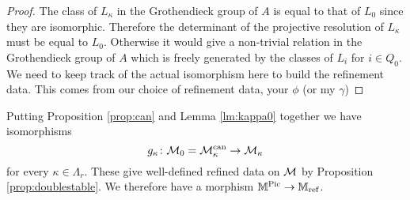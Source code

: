\documentclass[12pt]{amsart}
\begin{document}
\begin{proof}
The class of $L_\kappa$ in the Grothendieck group of $A$ is equal to that of $L_0$ since they are isomorphic.
Therefore the determinant of the projective resolution of $L_\kappa$ must be equal to $L_0$. Otherwise it would give a non-trivial relation in the Grothendieck group of $A$ which is freely generated by the classes of $L_i$ for $i\in Q_0$. {\red We need to keep track of the actual isomorphism here to build the refinement data. This comes from our choice of refinement data, your $\phi$ (or  my $\gamma$)}
\end{proof}

Putting Proposition \ref{prop:can} and Lemma \ref{lm:kappa0} together we have isomorphisms $$g_\kappa \colon \mathcal{M}_0 = \mathcal{M}_\kappa^{\text{can}} \rightarrow \mathcal{M}_\kappa$$
for every $\kappa \in \Lambda_r$.
These give well-defined refined data on $\mathcal{M}$  by Proposition \ref{prop:doublestable}.
We therefore have a morphism $\mathbb{M}^{\operatorname{Pic}} \rightarrow \mathbb{M}_\text{ref}$.




\end{document}
